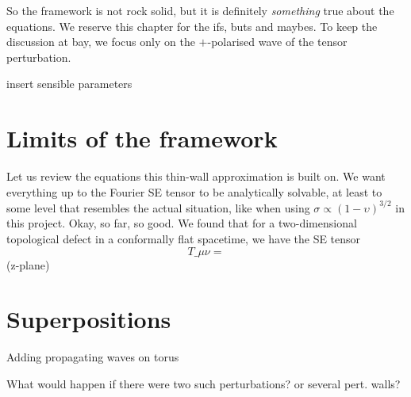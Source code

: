 
    




So the framework is not rock solid, but it is definitely \emph{something} true about the equations. We reserve this chapter for the ifs, buts and maybes. To keep the discussion at bay, we focus only on the $+$-polarised wave of the tensor perturbation.


\begin{bullets}
    \item insert sensible parameters
\end{bullets}



\section{Limits of the framework}
    Let us review the equations this thin-wall approximation is built on. 
    We want everything up to the Fourier SE tensor to be analytically solvable, at least to some level that resembles the actual situation, like when using $\sigma \propto (1-\upsilon)^{3/2}$ in this project.  
    Okay, so far, so good. We found that for a two-dimensional topological defect in a conformally flat spacetime, we have the SE tensor
    \begin{equation}
        T\_{\mu\nu} = 
    \end{equation}
    (z-plane) 



\section{Superpositions}
    \begin{bullets}
        \item Adding propagating waves on torus
        \item What would happen if there were two such perturbations? or several pert. walls?
    \end{bullets}
    